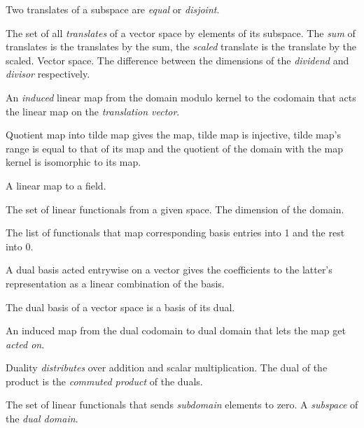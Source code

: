 \begin{multicols}{3}
  Two translates of a subspace are \textit{equal} or \textit{disjoint}.

  The set of all \textit{translates} of a vector space by elements of its subspace.
  The \textit{sum} of translates is the translates by the sum, the \textit{scaled} translate
  is the translate by the scaled.
   Vector space.
  The difference between the dimensions of the \textit{dividend} and \textit{divisor} respectively.

  An \textit{induced} linear map from the domain modulo kernel to the codomain that
  acts the linear map on the \textit{translation vector}.
  
  Quotient map into tilde map gives the map, tilde map is injective,
  tilde map's range is equal to that of its map and
  the quotient of the domain with the map kernel is isomorphic
  to its map.


  A linear map to a field.

  The set of linear functionals from a given space.
  The dimension of the domain.

  The list of functionals that map corresponding basis entries
  into 1 and the rest into 0.

  A dual basis acted entrywise on a vector gives the coefficients
  to the latter's representation as a linear combination of the basis.

  The dual basis of a vector space is a basis of its dual.

  An induced map from the dual codomain to dual domain
  that lets the map get \textit{acted on}.

  Duality \textit{distributes} over addition and scalar multiplication.
  The dual of the product is the \textit{commuted product} of the duals.

  The set of linear functionals that sends \textit{subdomain} elements to zero.
   A \textit{subspace} of the \textit{dual domain}.


\end{multicols}
